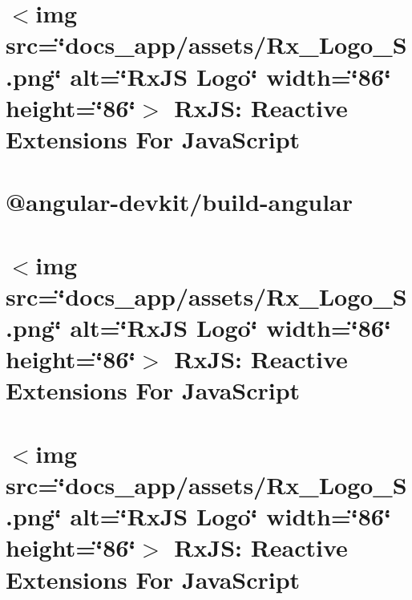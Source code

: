 \documentclass[twoside]{book}
\newcommand{\+}{\discretionary{\mbox{\scriptsize$\hookleftarrow$}}{}{}}
\begin{document}
\chapter{\texorpdfstring{$<$}{<}img src=\char`\"{}docs\+\_\+app/assets/\+Rx\+\_\+\+Logo\+\_\+\+S.\+png\char`\"{} alt=\char`\"{}\+Rx\+JS Logo\char`\"{} width=\char`\"{}86\char`\"{} height=\char`\"{}86\char`\"{}\texorpdfstring{$>$}{>} Rx\+JS\+: Reactive Extensions For Java\+Script}
\label{md__c___users_vaishnavi_jadhav__desktop__developer_code_mean_stack_example_client_node_modules__c8a57f760e89faa6408e14aeee6bcebb}

\chapter{@angular-\/devkit/build-\/angular}
\label{md__c___users_vaishnavi_jadhav__desktop__developer_code_mean_stack_example_client_node_modules__b74b8f37d4301d3b44ebed064646587b}

\chapter{\texorpdfstring{$<$}{<}img src=\char`\"{}docs\+\_\+app/assets/\+Rx\+\_\+\+Logo\+\_\+\+S.\+png\char`\"{} alt=\char`\"{}\+Rx\+JS Logo\char`\"{} width=\char`\"{}86\char`\"{} height=\char`\"{}86\char`\"{}\texorpdfstring{$>$}{>} Rx\+JS\+: Reactive Extensions For Java\+Script}
\label{md__c___users_vaishnavi_jadhav__desktop__developer_code_mean_stack_example_client_node_modules__07d44bc969efabbed7a77fdb473d09e1}

\chapter{\texorpdfstring{$<$}{<}img src=\char`\"{}docs\+\_\+app/assets/\+Rx\+\_\+\+Logo\+\_\+\+S.\+png\char`\"{} alt=\char`\"{}\+Rx\+JS Logo\char`\"{} width=\char`\"{}86\char`\"{} height=\char`\"{}86\char`\"{}\texorpdfstring{$>$}{>} Rx\+JS\+: Reactive Extensions For Java\+Script}
\label{md__c___users_vaishnavi_jadhav__desktop__developer_code_mean_stack_example_client_node_modules__4f56462432587e24d38ba8d1520a753e}

\end{document}
